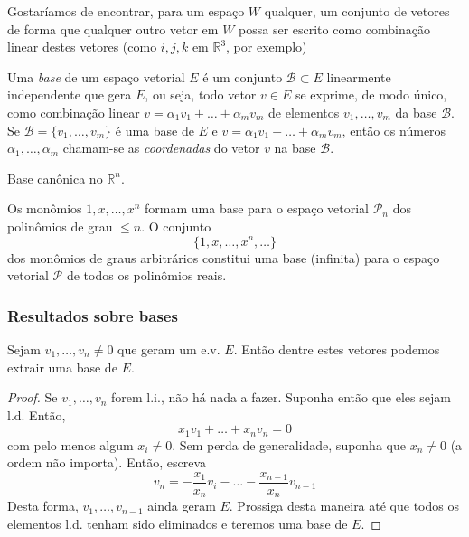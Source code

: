 Gostaríamos de encontrar, para um espaço $W$ qualquer, um conjunto de vetores de forma que qualquer outro vetor em $W$ possa ser escrito como combinação linear destes vetores (como $i,j,k$ em ${\mathbb{R}}^3$, por exemplo)

\begin{defi}
  Uma \emph{base} de um espaço vetorial $E$ é um conjunto ${\mathcal{B}}\subset E$ linearmente independente que gera $E$, ou seja, todo vetor $v\in E$ se exprime, de modo único, como combinação linear $v=\alpha_1 v_1 + \ldots + \alpha_m v_m$ de elementos $v_1,\ldots,v_m$ da base ${\mathcal{B}}$. Se ${\mathcal{B}} = \{ v_1,\ldots,v_m\}$ é uma base de $E$ e $v=\alpha_1 v_1 + \ldots +\alpha_mv_m$, então os números $\alpha_1,\ldots,\alpha_m$ chamam-se as \emph{coordenadas} do vetor $v$ na base ${\mathcal{B}}$.   
\end{defi}

\begin{exemplo}
  Base canônica no ${\mathbb{R}}^n$.
\end{exemplo}

\begin{exemplo}
  Os monômios $1,x,\ldots,x^n$ formam uma base para o espaço vetorial ${\mathcal{P}}_n$ dos polinômios de grau $\leq n$. O conjunto
  \begin{equation*}
    \{ 1,x,\ldots,x^n,\ldots \}
  \end{equation*}
  dos monômios de graus arbitrários constitui uma base (infinita) para o espaço vetorial ${\mathcal{P}}$ de todos os polinômios reais. 
\end{exemplo}

\subsubsection{Resultados sobre bases}

\begin{lema}
  Sejam $v_1,\ldots,v_n\ne 0$ que geram um e.v. $E$. Então dentre estes vetores podemos extrair uma base de $E$.
\end{lema}
\begin{proof}
Se $v_1,\ldots,v_n$ forem l.i., não há nada a fazer. Suponha então que eles sejam l.d. Então,
\begin{equation*}
	x_1v_1+\ldots+x_nv_n = 0
\end{equation*}
com pelo menos algum $x_i\ne 0$. Sem perda de generalidade, suponha que $x_n\ne 0$ (a ordem não importa). Então, escreva
\begin{equation*}
	v_n = -\frac{x_1}{x_n} v_i - \ldots - \frac{x_{n-1}}{x_n} v_{n-1}
\end{equation*}
Desta forma, $v_1, \ldots, v_{n-1}$ ainda geram $E$. Prossiga desta maneira até que todos os elementos l.d. tenham sido eliminados e teremos uma base de $E$.
\end{proof}

